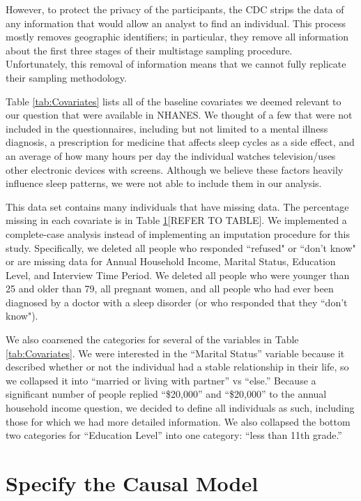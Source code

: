 \documentclass{article}
\begin{document}
However, to protect the privacy of the participants, the CDC strips the data of any information that would allow an analyst to find an individual.  This process mostly removes geographic identifiers; in particular, they remove all information about the first three stages of their multistage sampling procedure.  Unfortunately, this removal of information means that we cannot fully replicate their sampling methodology. 

Table \ref{tab:Covariates} lists all of the baseline covariates we deemed relevant to our question that were available in NHANES.  We thought of a few that were not included in the questionnaires, including but not limited to a mental illness diagnosis, a prescription for medicine that affects sleep cycles as a side effect, and an average of how many hours per day the individual watches television/uses other electronic devices with screens.  Although we believe these factors heavily influence sleep patterns, we were not able to include them in our analysis.

This data set contains many individuals that have missing data.  The percentage missing in each covariate is in Table \ref{}[REFER TO TABLE].  We implemented a complete-case analysis instead of implementing an imputation procedure for this study. Specifically, we deleted all people who responded ``refused" or ``don't know" or are missing data for Annual Household Income, Marital Status, Education Level, and Interview Time Period.  We deleted all people who were younger than 25 and older than 79, all pregnant women, and all people who had ever been diagnosed by a doctor with a sleep disorder (or who responded that they ``don't know").  

We also coarsened the categories for several of the variables in Table \ref{tab:Covariates}.  We were interested in the ``Marital Status'' variable because it described whether or not the individual had a stable relationship in their life, so we collapsed it into ``married or living with partner'' vs ``else.''  Because a significant number of people replied ``\$20,000'' and ``\$20,000'' to the annual household income question, we decided to define all individuals as such, including those for which we had more detailed information.  We also collapsed the bottom two categories for ``Education Level'' into one category: ``less than 11th grade.''

\section{Specify the Causal Model}
\end{document}
